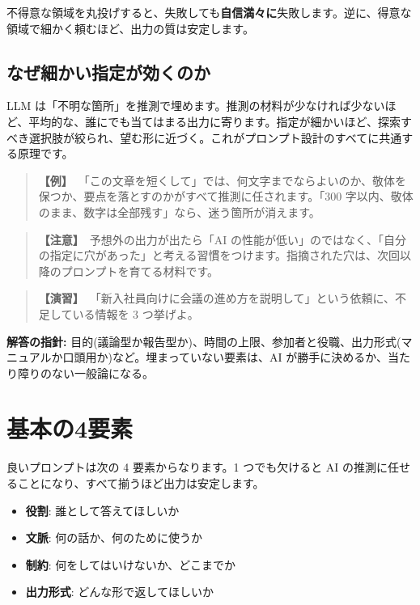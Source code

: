 \documentclass{article}
\begin{document}
不得意な領域を丸投げすると、失敗しても\textbf{自信満々に}失敗します。逆に、得意な領域で細かく頼むほど、出力の質は安定します。

\subsection{なぜ細かい指定が効くのか}

LLM は「不明な箇所」を推測で埋めます。推測の材料が少なければ少ないほど、平均的な、誰にでも当てはまる出力に寄ります。指定が細かいほど、探索すべき選択肢が絞られ、望む形に近づく。これがプロンプト設計のすべてに共通する原理です。

\begin{quote}
\textbf{【例】}\ 「この文章を短くして」では、何文字までならよいのか、敬体を保つか、要点を落とすのかがすべて推測に任されます。「300 字以内、敬体のまま、数字は全部残す」なら、迷う箇所が消えます。
\end{quote}

\begin{quote}
\textbf{【注意】}\ 予想外の出力が出たら「AI の性能が低い」のではなく、「自分の指定に穴があった」と考える習慣をつけます。指摘された穴は、次回以降のプロンプトを育てる材料です。
\end{quote}

\begin{quote}
\textbf{【演習】}\ 「新入社員向けに会議の進め方を説明して」という依頼に、不足している情報を 3 つ挙げよ。
\end{quote}

\textbf{解答の指針:} 目的(議論型か報告型か)、時間の上限、参加者と役職、出力形式(マニュアルか口頭用か)など。埋まっていない要素は、AI が勝手に決めるか、当たり障りのない一般論になる。

\section{基本の4要素}

良いプロンプトは次の 4 要素からなります。1 つでも欠けると AI の推測に任せることになり、すべて揃うほど出力は安定します。

\begin{itemize}
\item \textbf{役割}: 誰として答えてほしいか
\item \textbf{文脈}: 何の話か、何のために使うか
\item \textbf{制約}: 何をしてはいけないか、どこまでか
\item \textbf{出力形式}: どんな形で返してほしいか
\end{itemize}
\end{document}
